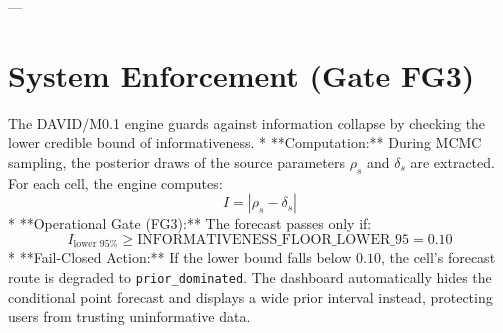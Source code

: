 \documentclass[11pt,a4paper]{article}
\begin{document}
---

\section{System Enforcement (Gate FG3)}
The DAVID/M0.1 engine guards against information collapse by checking the lower credible bound of informativeness. 
* **Computation:** During MCMC sampling, the posterior draws of the source parameters $\rho_s$ and $\delta_s$ are extracted. For each cell, the engine computes:
  \[
  I = |\rho_s - \delta_s|
  \]
* **Operational Gate (FG3):** The forecast passes only if:
  \[
  I_{\text{lower 95\%}} \ge \text{INFORMATIVENESS\_FLOOR\_LOWER\_95} = 0.10
  \]
* **Fail-Closed Action:** If the lower bound falls below $0.10$, the cell's forecast route is degraded to \texttt{prior\_dominated}. The dashboard automatically hides the conditional point forecast and displays a wide prior interval instead, protecting users from trusting uninformative data.
\end{document}
